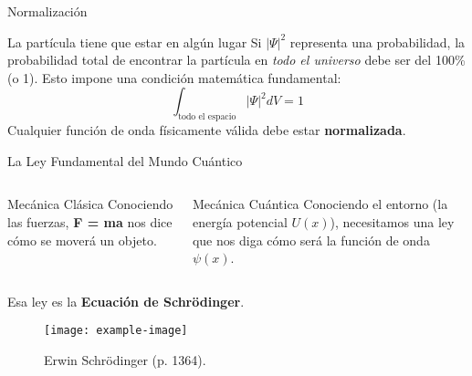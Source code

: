 
	



	
	
	



	

	
	\begin{frame}{Normalización}
		\begin{block}{La partícula tiene que estar en algún lugar}
			Si $|\Psi|^2$ representa una probabilidad, la probabilidad total de encontrar la partícula en \textit{todo el universo} debe ser del 100\% (o 1).
			\vspace{0.5em}
			Esto impone una condición matemática fundamental:
			\begin{equation*}
				\int_{\text{todo el espacio}} |\Psi|^2 dV = 1
			\end{equation*}
			Cualquier función de onda físicamente válida debe estar \textbf{normalizada}.
		\end{block}
	\end{frame}
	
	\begin{frame}{La Ley Fundamental del Mundo Cuántico}
		\begin{columns}
			\begin{block}{Mecánica Clásica}
				Conociendo las fuerzas, \textbf{F = ma} nos dice cómo se moverá un objeto.
			\end{block}
			\begin{block}{Mecánica Cuántica}
				Conociendo el entorno (la energía potencial $U(x)$), necesitamos una ley que nos diga cómo será la función de onda $\psi(x)$.
			\end{block}
		\end{columns}
		\vfill
		\centering
		Esa ley es la \textbf{Ecuación de Schrödinger}.
		\begin{figure}
			\texttt{[image: example-image]} %
			\caption{Erwin Schrödinger (p. 1364).}
		\end{figure}
	\end{frame}
	
